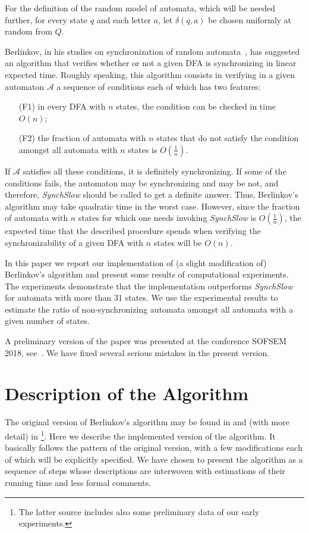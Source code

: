 \documentclass{jalc}
\begin{document}
For the definition of the random model of automata, which will be needed further, for every state $q$ and each letter $a$, let $\delta(q,a)$ be chosen uniformly at random from $Q$.

Berlinkov, in his studies on synchronization of random automata~\cite{Berlinkov:preprint,berl}, has suggested an algorithm that verifies whether or not a given DFA is synchronizing in linear expected time. Roughly speaking, this algorithm consists in verifying in a given automaton $\mathcal{A}$ a sequence of conditions each of which has two features:
\begin{itemize}
\item[(F1)] in every DFA with $n$ states, the condition can be checked in time $O(n)$;
\item[(F2)] the fraction of automata with $n$ states that do not satisfy the condition amongst all automata with $n$ states is $O(\frac1n)$.
 \end{itemize}
If $\mathcal{A}$ satisfies all these conditions, it is definitely synchronizing. If some of the conditions fails, the automaton may be synchronizing and may be not, and therefore, \emph{SynchSlow} should be called to get a definite answer. Thus, Berlinkov's algorithm may take quadratic time in the worst case. However, since the fraction of automata with $n$ states for which one needs invoking \emph{SynchSlow} is $O(\frac1n)$, the expected time that the described procedure spends when verifying the synchronizability of a given DFA with $n$ states will be $O(n)$.

In this paper we report our implementation of (a slight modification of) Berlinkov's algorithm and present some results of computational experiments. The experiments demonstrate that the implementation outperforms \emph{SynchSlow} for automata with more than 31 states. We use the experimental results to estimate the ratio of non-synchronizing automata amongst all automata with a given number of states.

A preliminary version of the paper was presented at the conference SOFSEM 2018, see~\cite{Ageev}. We have fixed several serious mistakes in the present version.

\section{Description of the Algorithm}

The original version of Ber\-lin\-kov's algorithm may be found in \cite[Section~2]{berl} and (with more detail) in \cite[Section~4]{Berlinkov:preprint}\footnote{The latter source includes also some preliminary data of our early experiments.}. Here we describe the implemented version of the algorithm. It basically follows the pattern of the original version, with a few modifications each of which will be explicitly specified. We have chosen to present the algorithm as a sequence of steps whose descriptions are interwoven with estimations of their running time and less formal comments.
\end{document}
